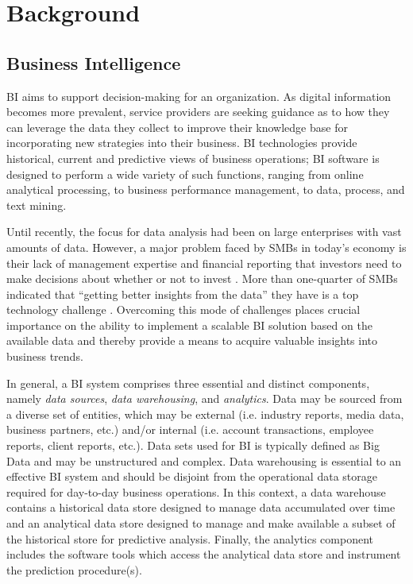 %
%
\chapter{Background}\label{ch:background}
\section{Business Intelligence}
BI aims to support decision-making for an organization. As digital information becomes more prevalent, service providers are seeking guidance as to how they can leverage the data they collect to improve their knowledge base for incorporating new strategies into their business. BI technologies provide historical, current and predictive views of business operations; BI software is designed to perform a wide variety of such functions, ranging from online analytical processing, to business performance management, to data, process, and text mining. 

Until recently, the focus for data analysis had been on large enterprises with vast amounts of data. However, a major problem faced by SMBs in today's economy is their lack of management expertise and financial reporting that investors need to make decisions about whether or not to invest \cite{Newberry}. More than one-quarter of SMBs indicated that ``getting better insights from the data'' they have is a top technology challenge \cite{smbroutes}. Overcoming this mode of challenges places crucial importance on the ability to implement a scalable BI solution based on the available data and thereby provide a means to acquire valuable insights into business trends.

In general, a BI system comprises three essential and distinct components, namely \textit{data sources}, \textit{data warehousing}, and \textit{analytics}. Data may be sourced from a diverse set of entities, which may be external (i.e. industry reports, media data, business partners, etc.) and/or internal (i.e. account transactions, employee reports, client reports, etc.). Data sets used for BI is typically defined as Big Data and may be unstructured and complex. Data warehousing is essential to an effective BI system and should be disjoint from the operational data storage required for day-to-day business operations. In this context, a data warehouse contains a historical data store designed to manage data accumulated over time and an analytical data store designed to manage and make available a subset of the historical store for predictive analysis. Finally, the analytics component includes the software tools which access the analytical data store and instrument the prediction procedure(s).


